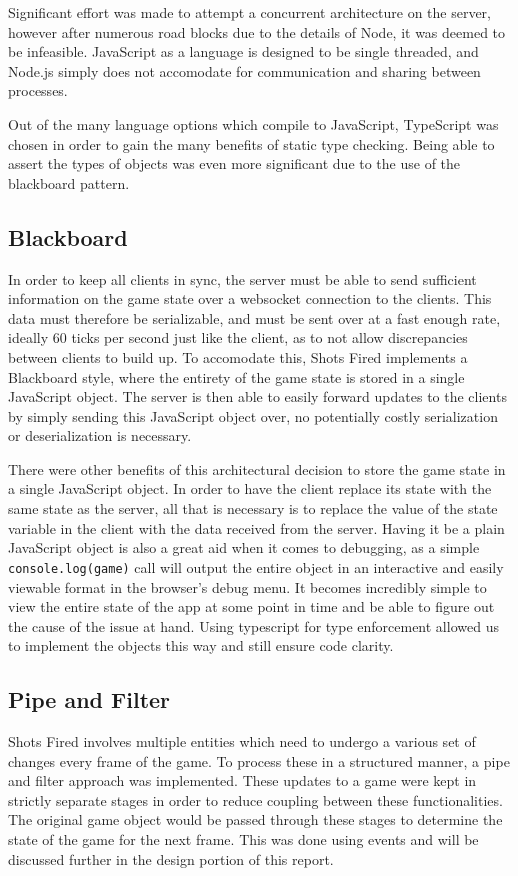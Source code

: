 \documentclass[12pt]{report}
\begin{document}
Significant effort was made to attempt a concurrent architecture on the server,
however after numerous road blocks due to the details of Node, it was deemed
to be infeasible.  JavaScript as a language is designed to be single threaded,
and Node.js simply does not accomodate for communication and sharing between
processes.

Out of the many language options which compile to JavaScript, TypeScript was
chosen in order to gain the many benefits of static type checking.  Being able
to assert the types of objects was even more significant due to the use of the
blackboard pattern. 

\subsection{Blackboard}
In order to keep all clients in sync, the server must be able to send
sufficient information on the game state over a websocket connection to the
clients.  This data must therefore be serializable, and must be sent over at a fast
enough rate, ideally 60 ticks per second just like the client, as to not allow
discrepancies between clients to build up.  To accomodate this, Shots Fired
implements a Blackboard style, where the entirety of the game state is stored in
a single JavaScript object.  The server is then able to easily forward updates
to the clients by simply sending this JavaScript object over, no potentially
costly serialization or deserialization is necessary.

There were other benefits of this architectural decision to store the game state in a
single JavaScript object.  In order to have the client replace its state with
the same state as the server, all that is necessary is to replace the value of
the state variable in the client with the data received from the server.  Having
it be a plain JavaScript object is also a great aid when it comes to debugging,
as a simple \texttt{console.log(game)} call will output the entire object in an
interactive and easily viewable format in the browser's debug menu.  It becomes
incredibly simple to view the entire state of the app at some point in time and
be able to figure out the cause of the issue at hand. Using typescript for type enforcement
allowed us to implement the objects this way and still ensure code clarity. 

\subsection{Pipe and Filter}
Shots Fired involves multiple entities which need to undergo a various set of
changes every frame of the game.  To process these in a structured manner, a
pipe and filter approach was implemented.  These updates to a game were kept
in strictly separate stages in order to reduce coupling between these
functionalities.  The original game object would be passed through these stages
to determine the state of the game for the next frame. This was done using events
and will be discussed further in the design portion of this report.
\end{document}
